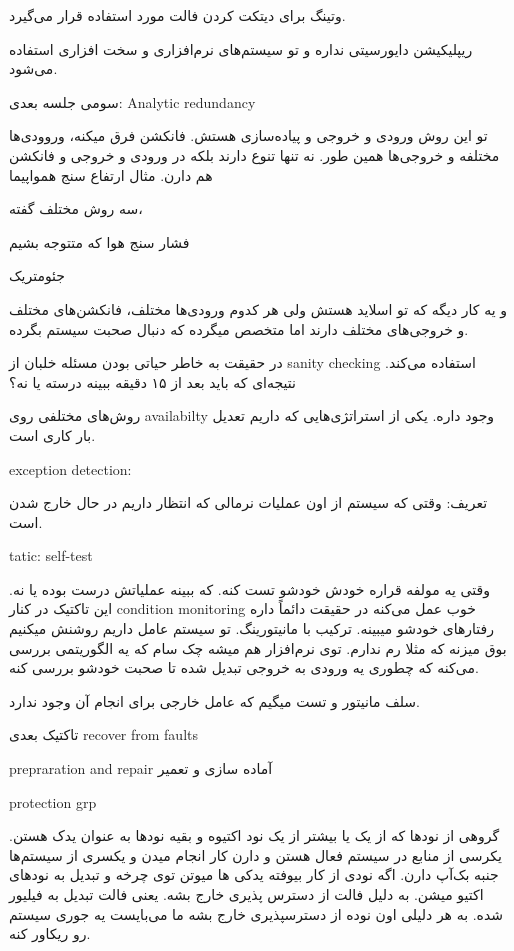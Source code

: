 وتینگ برای دیتکت کردن فالت مورد استفاده قرار می‌گیرد.

ریپلیکیشن دایورسیتی نداره و تو سیستم‌‌های نرم‌افزاری و سخت افزاری استفاده
می‌شود.

سومی جلسه بعدی: Analytic redundancy

تو این روش ورودی و خروجی و پیاده‌سازی هستش. فانکشن فرق میکنه، وروودی‌ها مختلفه و
خروجی‌ها همین طور. نه تنها تنوع دارند بلکه در ورودی و خروجی و فانکشن هم دارن.
مثال ارتفاع سنج همواپیما

سه روش مختلف گفته،

فشار سنج هوا که متتوجه بشیم

جئومتریک

و یه کار دیگه که تو اسلاید هستش ولی هر کدوم ورودی‌ها مختلف، فانکشن‌های مختلف و
خروجی‌های مختلف دارند اما متخصص میگرده که دنبال صحبت سیستم بگرده.

در حقیقت به خاطر حیاتی بودن مسئله خلبان از sanity checking استفاده می‌کند.
نتیجه‌ای که باید بعد از ۱۵ دقیقه ببینه درسته یا نه؟

روش‌های مختلفی روی availabilty وجود داره. یکی از استراتژی‌هایی که داریم تعدیل
بار کاری است.

exception detection:

تعریف: وقتی که سیستم از اون عملیات نرمالی که انتظار داریم در حال خارج شدن است.


tatic: self-test

وقتی یه مولفه قراره خودش خودشو تست کنه. که ببینه عملیاتش درست بوده یا نه. این
تاکتیک در کنار condition monitoring خوب عمل می‌کنه در حقیقت دائماً داره
رفتار‌های خودشو میبینه. ترکیب با مانیتورینگ. تو سیستم عامل داریم روشنش میکنیم
بوق میزنه که مثلا رم ندارم. توی نرم‌افزار هم میشه چک سام که یه الگوریتمی بررسی
می‌کنه که چطوری یه ورودی به خروجی تبدیل شده تا صحبت خودشو بررسی کنه.

سلف مانیتور و تست میگیم که عامل خارجی برای انجام آن وجود ندارد.

تاکتیک بعدی recover from faults

prepraration and repair آماده سازی و تعمیر

protection grp

گروهی از نودها که از یک یا بیشتر از یک نود اکتیوه و بقیه نود‌ها به عنوان یدک
هستن. یکرسی از منابع در سیستم فعال هستن و دارن کار انجام میدن و یکسری از
سیستم‌ها جنبه بک‌آپ دارن. اگه نودی از کار بیوفته یدکی ها میوتن توی چرخه و تبدیل
به نود‌های اکتیو میشن. به دلیل فالت از دسترس پذیری خارج بشه. یعنی فالت تبدیل به
فیلیور شده. به هر دلیلی اون نوده از دسترسپذیری خارج بشه ما می‌بایست یه جوری
سیستم رو ریکاور کنه.

